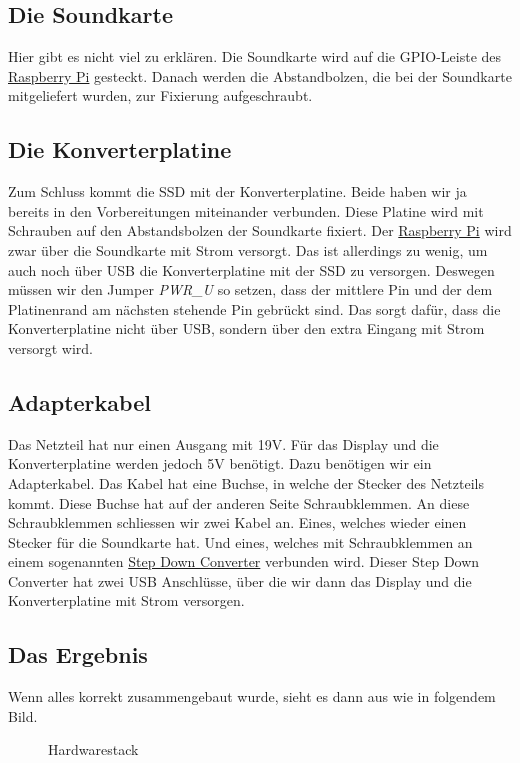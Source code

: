 \documentclass[12pt,a4paper]{article}
\newcommand{\jpaimg}[2]{\begin{figure}[H]\centering\fbox{\texttt{[image: \#1]}}\caption{#2}\label{fig:#2}\end{figure}}
\newcommand{\rpi}{\href{https://www.raspberrypi.org/}{Raspberry Pi}\index{Raspberry Pi}}
\begin{document}
\subsection{Die Soundkarte}
Hier gibt es nicht viel zu erklären. Die Soundkarte wird auf die GPIO-Leiste des \rpi{} gesteckt. Danach werden die Abstandbolzen, die bei der Soundkarte
mitgeliefert wurden, zur Fixierung aufgeschraubt.

\subsection{Die Konverterplatine}
Zum Schluss kommt die SSD mit der Konverterplatine. Beide haben wir ja bereits in den Vorbereitungen miteinander verbunden. Diese Platine wird mit Schrauben auf
den Abstandsbolzen der Soundkarte fixiert. Der \rpi{} wird zwar über die Soundkarte mit Strom versorgt. Das ist allerdings zu wenig, um auch noch über USB die
Konverterplatine mit der SSD zu versorgen. Deswegen müssen wir den Jumper \textit{PWR\_U} so setzen, dass der mittlere Pin und der dem Platinenrand am nächsten
stehende Pin gebrückt sind. Das sorgt dafür, dass die Konverterplatine nicht über USB, sondern über den extra Eingang mit Strom versorgt wird.

\subsection{Adapterkabel}
Das Netzteil hat nur einen Ausgang mit 19V. Für das Display und die Konverterplatine werden jedoch 5V benötigt. Dazu benötigen wir ein Adapterkabel. Das Kabel
hat eine Buchse, in welche der Stecker des Netzteils kommt. Diese Buchse hat auf der anderen Seite Schraubklemmen. An diese Schraubklemmen schliessen wir zwei
Kabel an. Eines, welches wieder einen Stecker für die Soundkarte hat. Und eines, welches mit Schraubklemmen an einem sogenannten
\href{https://de.wikipedia.org/wiki/Abw\%C3\%A4rtswandler}{Step Down Converter} verbunden wird. Dieser Step Down Converter hat zwei USB Anschlüsse, über die wir
dann das Display und die Konverterplatine mit Strom versorgen.

\newpage
\subsection{Das Ergebnis}
Wenn alles korrekt zusammengebaut wurde, sieht es dann aus wie in folgendem Bild.

\jpaimg{./../images/bbwopwr.png}{Hardwarestack}

\newpage
\end{document}
